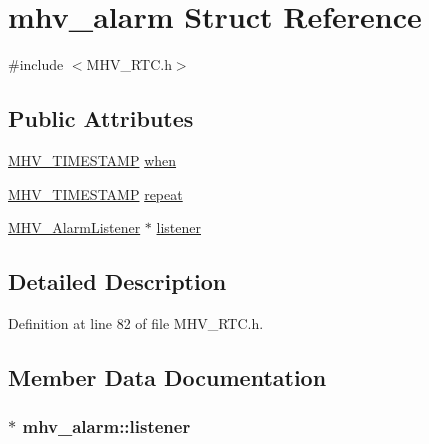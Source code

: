 \hypertarget{structmhv__alarm}{
\section{mhv\-\_\-alarm \-Struct \-Reference}
\label{structmhv__alarm}
}


{\ttfamily \#include $<$\-M\-H\-V\-\_\-\-R\-T\-C.\-h$>$}

\subsection*{\-Public \-Attributes}
\begin{DoxyCompactItemize}
\item 
\hyperlink{_m_h_v___r_t_c_8h_a1e30d3a92b1b868286bd0d619245d8a6}{\-M\-H\-V\-\_\-\-T\-I\-M\-E\-S\-T\-A\-M\-P} \hyperlink{structmhv__alarm_acbab8b3b4efa4d891d598cbd5b47fb7c}{when}
\item 
\hyperlink{_m_h_v___r_t_c_8h_a1e30d3a92b1b868286bd0d619245d8a6}{\-M\-H\-V\-\_\-\-T\-I\-M\-E\-S\-T\-A\-M\-P} \hyperlink{structmhv__alarm_ad8195c11cd5d6ff3bb37d01185c04af2}{repeat}
\item 
\hyperlink{class_m_h_v___alarm_listener}{\-M\-H\-V\-\_\-\-Alarm\-Listener} $\ast$ \hyperlink{structmhv__alarm_a6186f7bbb237eebe47cc16a5a94272fb}{listener}
\end{DoxyCompactItemize}


\subsection{\-Detailed \-Description}


\-Definition at line 82 of file \-M\-H\-V\-\_\-\-R\-T\-C.\-h.



\subsection{\-Member \-Data \-Documentation}
\hypertarget{structmhv__alarm_a6186f7bbb237eebe47cc16a5a94272fb}{
\subsubsection[{listener}]{$\ast$ {\bf mhv\-\_\-alarm\-::listener}}}
\label{structmhv__alarm_a6186f7bbb237eebe47cc16a5a94272fb}


